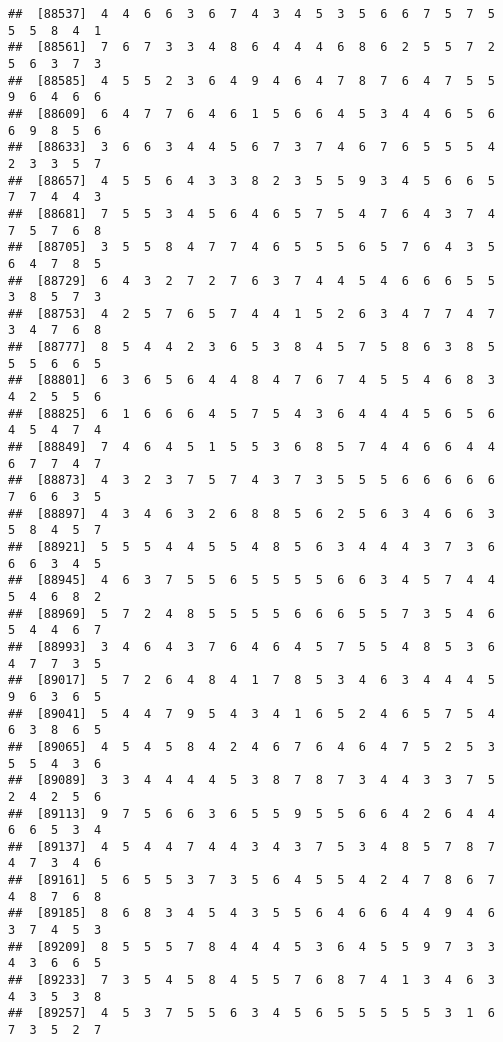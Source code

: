 \documentclass[
]{book}
\begin{document}
\begin{verbatim}
##  [88537]  4  4  6  6  3  6  7  4  3  4  5  3  5  6  6  7  5  7  5  5  5  8  4  1
##  [88561]  7  6  7  3  3  4  8  6  4  4  4  6  8  6  2  5  5  7  2  5  6  3  7  3
##  [88585]  4  5  5  2  3  6  4  9  4  6  4  7  8  7  6  4  7  5  5  9  6  4  6  6
##  [88609]  6  4  7  7  6  4  6  1  5  6  6  4  5  3  4  4  6  5  6  6  9  8  5  6
##  [88633]  3  6  6  3  4  4  5  6  7  3  7  4  6  7  6  5  5  5  4  2  3  3  5  7
##  [88657]  4  5  5  6  4  3  3  8  2  3  5  5  9  3  4  5  6  6  5  7  7  4  4  3
##  [88681]  7  5  5  3  4  5  6  4  6  5  7  5  4  7  6  4  3  7  4  7  5  7  6  8
##  [88705]  3  5  5  8  4  7  7  4  6  5  5  5  6  5  7  6  4  3  5  6  4  7  8  5
##  [88729]  6  4  3  2  7  2  7  6  3  7  4  4  5  4  6  6  6  5  5  3  8  5  7  3
##  [88753]  4  2  5  7  6  5  7  4  4  1  5  2  6  3  4  7  7  4  7  3  4  7  6  8
##  [88777]  8  5  4  4  2  3  6  5  3  8  4  5  7  5  8  6  3  8  5  5  5  6  6  5
##  [88801]  6  3  6  5  6  4  4  8  4  7  6  7  4  5  5  4  6  8  3  4  2  5  5  6
##  [88825]  6  1  6  6  6  4  5  7  5  4  3  6  4  4  4  5  6  5  6  4  5  4  7  4
##  [88849]  7  4  6  4  5  1  5  5  3  6  8  5  7  4  4  6  6  4  4  6  7  7  4  7
##  [88873]  4  3  2  3  7  5  7  4  3  7  3  5  5  5  6  6  6  6  6  7  6  6  3  5
##  [88897]  4  3  4  6  3  2  6  8  8  5  6  2  5  6  3  4  6  6  3  5  8  4  5  7
##  [88921]  5  5  5  4  4  5  5  4  8  5  6  3  4  4  4  3  7  3  6  6  6  3  4  5
##  [88945]  4  6  3  7  5  5  6  5  5  5  5  6  6  3  4  5  7  4  4  5  4  6  8  2
##  [88969]  5  7  2  4  8  5  5  5  5  6  6  6  5  5  7  3  5  4  6  5  4  4  6  7
##  [88993]  3  4  6  4  3  7  6  4  6  4  5  7  5  5  4  8  5  3  6  4  7  7  3  5
##  [89017]  5  7  2  6  4  8  4  1  7  8  5  3  4  6  3  4  4  4  5  9  6  3  6  5
##  [89041]  5  4  4  7  9  5  4  3  4  1  6  5  2  4  6  5  7  5  4  6  3  8  6  5
##  [89065]  4  5  4  5  8  4  2  4  6  7  6  4  6  4  7  5  2  5  3  5  5  4  3  6
##  [89089]  3  3  4  4  4  4  5  3  8  7  8  7  3  4  4  3  3  7  5  2  4  2  5  6
##  [89113]  9  7  5  6  6  3  6  5  5  9  5  5  6  6  4  2  6  4  4  6  6  5  3  4
##  [89137]  4  5  4  4  7  4  4  3  4  3  7  5  3  4  8  5  7  8  7  4  7  3  4  6
##  [89161]  5  6  5  5  3  7  3  5  6  4  5  5  4  2  4  7  8  6  7  4  8  7  6  8
##  [89185]  8  6  8  3  4  5  4  3  5  5  6  4  6  6  4  4  9  4  6  3  7  4  5  3
##  [89209]  8  5  5  5  7  8  4  4  4  5  3  6  4  5  5  9  7  3  3  4  3  6  6  5
##  [89233]  7  3  5  4  5  8  4  5  5  7  6  8  7  4  1  3  4  6  3  4  3  5  3  8
##  [89257]  4  5  3  7  5  5  6  3  4  5  6  5  5  5  5  5  3  1  6  7  3  5  2  7

\end{verbatim}
\end{document}
